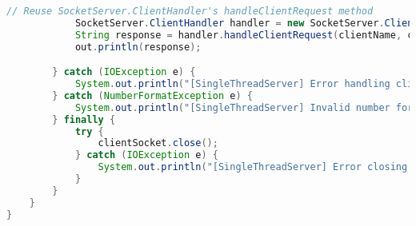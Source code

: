 \documentclass{article}
\begin{document}
\begin{lstlisting}[language=Java, caption={SocketServerSingleThread.java - Single-threaded Server}]
            // Reuse SocketServer.ClientHandler's handleClientRequest method
            SocketServer.ClientHandler handler = new SocketServer.ClientHandler(clientSocket, serverSocket);
            String response = handler.handleClientRequest(clientName, clientNumber);
            out.println(response);

        } catch (IOException e) {
            System.out.println("[SingleThreadServer] Error handling client: " + e.getMessage());
        } catch (NumberFormatException e) {
            System.out.println("[SingleThreadServer] Invalid number format from client.");
        } finally {
            try {
                clientSocket.close();
            } catch (IOException e) {
                System.out.println("[SingleThreadServer] Error closing client socket: " + e.getMessage());
            }
        }
    }
}
\end{lstlisting}
\end{document}
